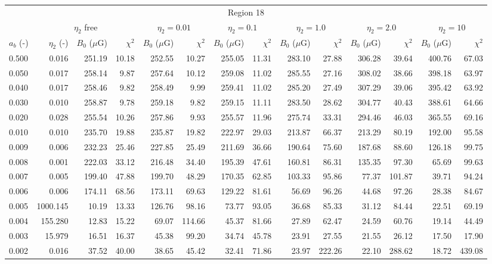\begin{tabular}{@{}lrrrrrrrrrrrrr@{}}
\toprule
\multicolumn{14}{c}{Region 18} \\
\cmidrule{1-14}
{} & \multicolumn{3}{c}{$\eta_2$ free} & \multicolumn{2}{c}{$\eta_2 = 0.01$}
   & \multicolumn{2}{c}{$\eta_2 = 0.1$} & \multicolumn{2}{c}{$\eta_2 = 1.0$}
   & \multicolumn{2}{c}{$\eta_2 = 2.0$} & \multicolumn{2}{c}{$\eta_2 = 10$} \\
\cmidrule(lr){2-4} \cmidrule(lr){5-6} \cmidrule(lr){7-8} \cmidrule(lr){9-10}
    \cmidrule(lr){11-12} \cmidrule(lr){13-14}
$a_b$ (-) & $\eta_2$ (-) & $B_0$ ($\mu$G) & $\chi^2$
& $B_0$ ($\mu$G) & $\chi^2$ & $B_0$ ($\mu$G) & $\chi^2$
& $B_0$ ($\mu$G) & $\chi^2$ & $B_0$ ($\mu$G) & $\chi^2$
& $B_0$ ($\mu$G) & $\chi^2$ \\
\cmidrule{1-14}
0.500 & 0.016 & 251.19 & 10.18 & 252.55 & 10.27 & 255.05 & 11.31 & 283.10 & 27.88 & 306.28 & 39.64 & 400.76 & 67.03 \\
0.050 & 0.017 & 258.14 & 9.87 & 257.64 & 10.12 & 259.08 & 11.02 & 285.55 & 27.16 & 308.02 & 38.66 & 398.18 & 63.97 \\
0.040 & 0.017 & 258.46 & 9.82 & 258.49 & 9.99 & 259.41 & 11.02 & 285.20 & 27.49 & 307.29 & 39.06 & 395.42 & 63.92 \\
0.030 & 0.010 & 258.87 & 9.78 & 259.18 & 9.82 & 259.15 & 11.11 & 283.50 & 28.62 & 304.77 & 40.43 & 388.61 & 64.66 \\
0.020 & 0.028 & 255.54 & 10.26 & 257.86 & 9.93 & 255.57 & 11.96 & 275.74 & 33.31 & 294.46 & 46.03 & 365.55 & 69.16 \\
0.010 & 0.010 & 235.70 & 19.88 & 235.87 & 19.82 & 222.97 & 29.03 & 213.87 & 66.37 & 213.29 & 80.19 & 192.00 & 95.58 \\
0.009 & 0.006 & 232.23 & 25.46 & 227.85 & 25.49 & 211.69 & 36.66 & 190.64 & 75.60 & 187.68 & 88.60 & 126.18 & 99.75 \\
0.008 & 0.001 & 222.03 & 33.12 & 216.48 & 34.40 & 195.39 & 47.61 & 160.81 & 86.31 & 135.35 & 97.30 & 65.69 & 99.63 \\
0.007 & 0.005 & 199.40 & 47.88 & 199.70 & 48.29 & 170.35 & 62.85 & 103.33 & 95.86 & 77.37 & 101.87 & 39.71 & 94.24 \\
0.006 & 0.006 & 174.11 & 68.56 & 173.11 & 69.63 & 129.22 & 81.61 & 56.69 & 96.26 & 44.68 & 97.26 & 28.38 & 84.67 \\
0.005 & 1000.145 & 10.19 & 13.33 & 126.76 & 98.16 & 73.77 & 93.05 & 36.68 & 85.33 & 31.12 & 84.44 & 22.51 & 69.19 \\
0.004 & 155.280 & 12.83 & 15.22 & 69.07 & 114.66 & 45.37 & 81.66 & 27.89 & 62.47 & 24.59 & 60.76 & 19.14 & 44.49 \\
0.003 & 15.979 & 16.51 & 16.37 & 45.38 & 99.20 & 34.74 & 45.78 & 23.91 & 27.55 & 21.55 & 26.12 & 17.50 & 17.90 \\
0.002 & 0.016 & 37.52 & 40.00 & 38.65 & 45.42 & 32.41 & 71.86 & 23.97 & 222.26 & 22.10 & 288.62 & 18.72 & 439.08 \\


\end{tabular}
